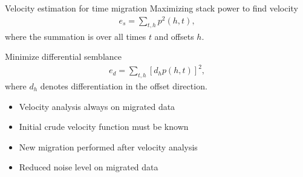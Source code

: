 \documentclass[xcolor=dvipsnames,notes]{beamer}
\begin{document}
\begin{frame}{Velocity estimation for time migration}
Maximizing stack power to find velocity
%
\begin{eqnarray}
   e_s= \sum_{t,h} p^2(h,t),
\label{eq:si-602}
\end{eqnarray}
where the summation is over all times $t$ and offsets $h$.

Minimize differential semblance
%
\begin{eqnarray}
  e_d = \sum_{t,h} [d_h p(h,t)]^2,
\label{eq:si-603}
\end{eqnarray}
where $d_h$ denotes differentiation in the
offset direction.
\begin{itemize}
\item Velocity analysis  always on migrated data
\item Initial crude velocity function must be known
\item New migration performed after velocity analysis
\item Reduced noise level on migrated data
\end{itemize}
\end{frame}
\end{document}
